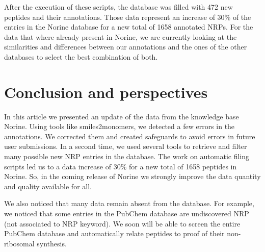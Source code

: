 \documentclass[long, final]{jobim2017}
\begin{document}
After the execution of these scripts, the database was filled with 472 new peptides and their annotations.
Those data represent an increase of 30\% of the entries in the Norine database for a new total of 1658 annotated NRPs.
For the data that where already present in Norine, we are currently looking at the similarities and differences between our annotations and the ones of the other databases to select the best combination of both.


\section{Conclusion and perspectives}

In this article we presented an update of the data from the knowledge base Norine.
Using tools like smiles2monomers, we detected a few errors in the annotations.
We corrected them and created safeguards to avoid errors in future user submissions.
In a second time, we used several tools to retrieve and filter many possible new NRP entries in the database.
The work on automatic filing scripts led us to a data increase of 30\% for a new total of 1658 peptides in Norine.
So, in the coming release of Norine we strongly improve the data quantity and quality available for all.

We also noticed that many data remain absent from the database.
For example, we noticed that some entries in the PubChem database are undiscovered NRP (not associated to NRP keyword).
We soon will be able to screen the entire PubChem database and automatically relate peptides to proof of their non-ribosomal synthesis.



 
 
\end{document}
